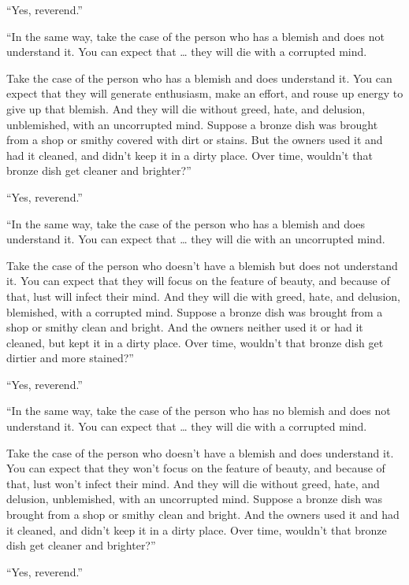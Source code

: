 \documentclass[12pt,openany]{book}%
\begin{document}
“Yes, reverend.” 

“In the same way, take the case of the person who has a blemish and does not understand it. You can expect that … they will die with a corrupted mind. 

Take the case of the person who has a blemish and does understand it. You can expect that they will generate enthusiasm, make an effort, and rouse up energy to give up that blemish. And they will die without greed, hate, and delusion, unblemished, with an uncorrupted mind. Suppose a bronze dish was brought from a shop or smithy covered with dirt or stains. But the owners used it and had it cleaned, and didn’t keep it in a dirty place. Over time, wouldn’t that bronze dish get cleaner and brighter?” 

“Yes, reverend.” 

“In the same way, take the case of the person who has a blemish and does understand it. You can expect that … they will die with an uncorrupted mind. 

Take the case of the person who doesn’t have a blemish but does not understand it. You can expect that they will focus on the feature of beauty, and because of that, lust will infect their mind. And they will die with greed, hate, and delusion, blemished, with a corrupted mind. Suppose a bronze dish was brought from a shop or smithy clean and bright. And the owners neither used it or had it cleaned, but kept it in a dirty place. Over time, wouldn’t that bronze dish get dirtier and more stained?” 

“Yes, reverend.” 

“In the same way, take the case of the person who has no blemish and does not understand it. You can expect that … they will die with a corrupted mind. 

Take the case of the person who doesn’t have a blemish and does understand it. You can expect that they won’t focus on the feature of beauty, and because of that, lust won’t infect their mind. And they will die without greed, hate, and delusion, unblemished, with an uncorrupted mind. Suppose a bronze dish was brought from a shop or smithy clean and bright. And the owners used it and had it cleaned, and didn’t keep it in a dirty place. Over time, wouldn’t that bronze dish get cleaner and brighter?” 

“Yes, reverend.” 
\end{document}
